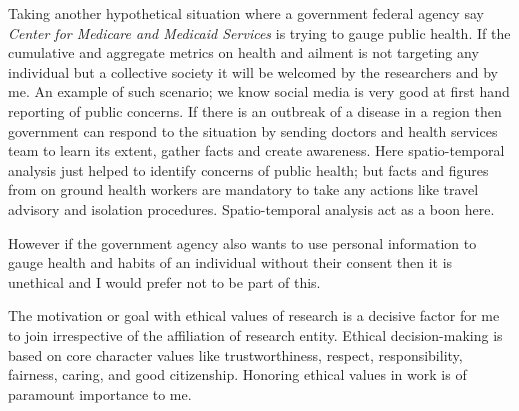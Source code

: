 Taking another hypothetical situation where a government federal agency say {\em Center for Medicare and Medicaid Services} is trying to gauge public health.
If the cumulative and aggregate metrics on health and ailment is not targeting any individual but a collective society it will be welcomed by the researchers and by me. An example of such scenario; we know social media is very good at first hand reporting of public concerns. If there is an outbreak of a disease in a region then government can respond to the situation by sending doctors and health services team to learn its extent, gather facts and create awareness. Here spatio-temporal analysis just helped to identify concerns of public health; but facts and figures from on ground health workers are mandatory to take any actions like travel advisory and isolation procedures. Spatio-temporal analysis act as a boon here.

However if the government agency also wants to use personal information to gauge health and habits of an individual without their consent then it is unethical and I would prefer not to be part of this.

The motivation or goal with ethical values of research is a decisive factor for me to join irrespective of the affiliation of research entity.
Ethical decision-making is based on core character values like trustworthiness, respect, responsibility, fairness, caring, and good citizenship.
Honoring ethical values in work is of paramount importance to me.

